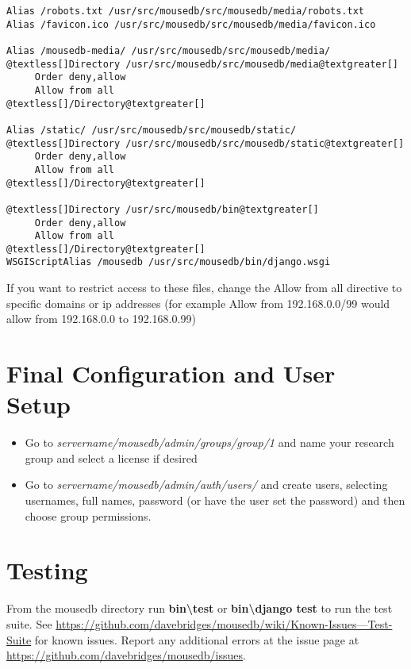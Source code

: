 \documentclass[letterpaper,10pt,english]{sphinxmanual}
\begin{document}
\begin{Verbatim}[commandchars=@\[\]]
Alias /robots.txt /usr/src/mousedb/src/mousedb/media/robots.txt
Alias /favicon.ico /usr/src/mousedb/src/mousedb/media/favicon.ico

Alias /mousedb-media/ /usr/src/mousedb/src/mousedb/media/
@textless[]Directory /usr/src/mousedb/src/mousedb/media@textgreater[]
     Order deny,allow
     Allow from all
@textless[]/Directory@textgreater[]

Alias /static/ /usr/src/mousedb/src/mousedb/static/
@textless[]Directory /usr/src/mousedb/src/mousedb/static@textgreater[]
     Order deny,allow
     Allow from all
@textless[]/Directory@textgreater[]

@textless[]Directory /usr/src/mousedb/bin@textgreater[]
     Order deny,allow
     Allow from all
@textless[]/Directory@textgreater[]
WSGIScriptAlias /mousedb /usr/src/mousedb/bin/django.wsgi
\end{Verbatim}

If you want to restrict access to these files, change the Allow from all directive to specific domains or ip addresses (for example Allow from 192.168.0.0/99 would allow from 192.168.0.0 to 192.168.0.99)


\section{Final Configuration and User Setup}
\label{installation:final-configuration-and-user-setup}\begin{itemize}
\item {} 
Go to \emph{servername/mousedb/admin/groups/group/1} and name your research group and select a license if desired

\item {} 
Go to \emph{servername/mousedb/admin/auth/users/} and create users, selecting usernames, full names, password (or have the user set the password) and then choose group permissions.

\end{itemize}


\section{Testing}
\label{installation:testing}
From the mousedb directory run \textbf{bin\textbackslash{}test} or \textbf{bin\textbackslash{}django test} to run the test suite.  See \href{https://github.com/davebridges/mousedb/wiki/Known-Issues---Test-Suite}{https://github.com/davebridges/mousedb/wiki/Known-Issues---Test-Suite} for known issues.  Report any additional errors at the issue page at \href{https://github.com/davebridges/mousedb/issues}{https://github.com/davebridges/mousedb/issues}.
\end{document}
